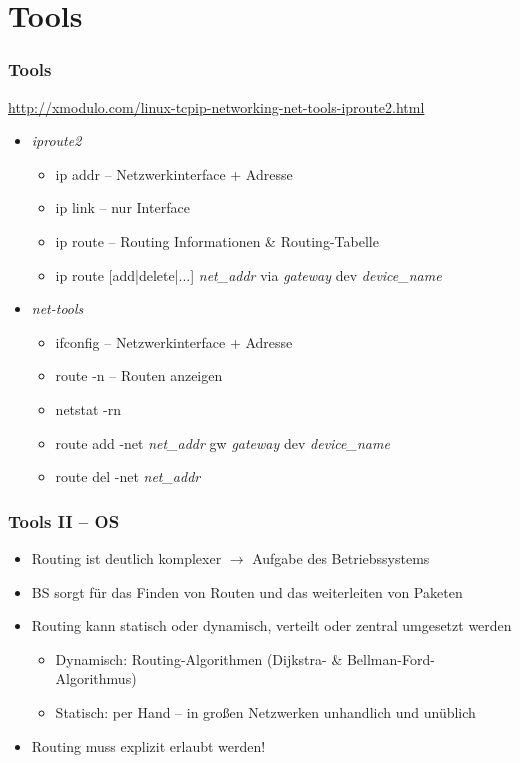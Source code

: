 \documentclass[xcolor=dvipsnames, aspectratio=169]{beamer}
\begin{document}
\section{Tools}
\begin{frame}
	\frametitle{Tools}
	\vspace{-0.75cm}
	\url{http://xmodulo.com/linux-tcpip-networking-net-tools-iproute2.html}
	\begin{itemize}
		\item \emph{iproute2}
		\begin{itemize}
			\item ip addr -- Netzwerkinterface + Adresse
			\item ip link -- nur Interface
			\item ip route -- Routing Informationen \& Routing-Tabelle
			\item ip route [add|delete|...] \emph{net\_addr} via \emph{gateway} dev \emph{device\_name}
		\end{itemize}
		\item \emph{net-tools}
		\begin{itemize}
			\item ifconfig -- Netzwerkinterface + Adresse
			\item route -n -- Routen anzeigen
			\item netstat -rn
			\item route add -net \emph{net\_addr} gw \emph{gateway} dev \emph{device\_name}
			\item route del -net \emph{net\_addr}
		\end{itemize}
	\end{itemize}
\end{frame}

\begin{frame}
	\frametitle{Tools II -- OS}
	\begin{itemize}
		\item Routing ist deutlich komplexer $\rightarrow$ Aufgabe des Betriebssystems
		\item BS sorgt für das Finden von Routen und das weiterleiten von Paketen
		\item Routing kann statisch oder dynamisch, verteilt oder zentral umgesetzt werden
		\begin{itemize}
			\item Dynamisch: Routing-Algorithmen (Dijkstra- \& Bellman-Ford-Algorithmus)
			\item Statisch: per Hand -- in großen Netzwerken unhandlich und unüblich
		\end{itemize}
		\item Routing muss explizit erlaubt werden!
	\end{itemize}
\end{frame}
\end{document}
